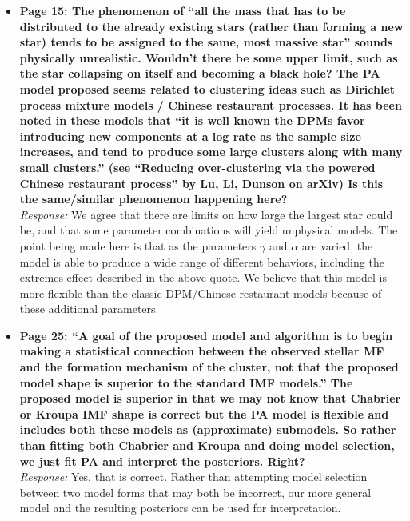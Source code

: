 \documentclass[11pt, oneside]{article}   	%
\begin{document}
\begin{itemize}
\item {\bf Page 15: The phenomenon of ``all the mass that has to be distributed to the already existing stars (rather than forming a new star) tends to be assigned to the same, most massive star'' sounds physically unrealistic. Wouldn't there be some upper limit, such as the star collapsing on itself and becoming a black hole? The PA model proposed seems related to clustering ideas such as Dirichlet process mixture models / Chinese
restaurant processes. It has been noted in these models that ``it is well known the DPMs favor introducing new components at a log rate as the sample size increases, and tend to produce some large clusters along with many small clusters.'' (see ``Reducing over-clustering via the powered Chinese restaurant process'' by Lu, Li, Dunson on arXiv) Is this the same/similar phenomenon happening here?
} \\
\noindent \emph{Response:} We agree that there are limits on how large the largest star could be, and that some parameter combinations will
yield unphysical models. The point being made here is that as the parameters $\gamma$ and $\alpha$ are varied, the model is able to produce
a wide range of different behaviors, including the extremes effect described in the above quote. We believe that this model is more flexible
than the classic DPM/Chinese restaurant models because of these additional parameters.

\bigskip

\item {\bf Page 25: ``A goal of the proposed model and algorithm is to begin making a statistical connection between the observed stellar MF and the formation mechanism of the cluster, not that the proposed model shape is superior to the standard IMF models.'' The proposed model is superior in that we may not know that Chabrier or Kroupa IMF shape is correct but the PA model is flexible and includes both these models as (approximate) submodels. So rather than fitting both Chabrier and Kroupa and doing model selection, we just fit PA and interpret the posteriors. Right?} \\
\noindent \emph{Response:} Yes, that is correct.  Rather than attempting model selection between two model forms that may both be incorrect, our more general model and the resulting posteriors can be used for interpretation.
\bigskip
\end{itemize}


\\
\end{document}
